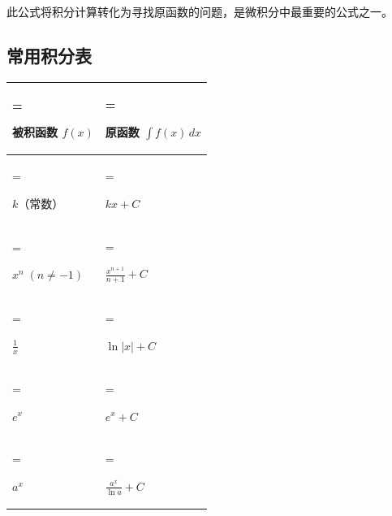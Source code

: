 \documentclass{harryopo-mathnotes}
\begin{document}
此公式将积分计算转化为寻找原函数的问题，是微积分中最重要的公式之一。

\subsection{常用积分表}\label{ux5e38ux7528ux79efux5206ux8868}

\begin{table}[htbp]
\centering
\begin{tabularx}{\textwidth}{>{\hsize=0.800\hsize\linewidth=\hsize\raggedright\arraybackslash}X>{\hsize=1.200\hsize\linewidth=\hsize\raggedright\arraybackslash}X}
\toprule
\textbf{被积函数 \(f(x)\)} & \textbf{原函数 \(\int f(x)\,dx\)} \\
\midrule
\(k\)（常数） & \(kx + C\) \\
\(x^n \; (n \neq -1)\) & \(\frac{x^{n+1}}{n+1} + C\) \\
\(\frac{1}{x}\) & \(\ln|x| + C\) \\
\(e^x\) & \(e^x + C\) \\
\(a^x\) & \(\frac{a^x}{\ln a} + C\) \\
\bottomrule
\end{tabularx}
\end{table}
\end{document}
